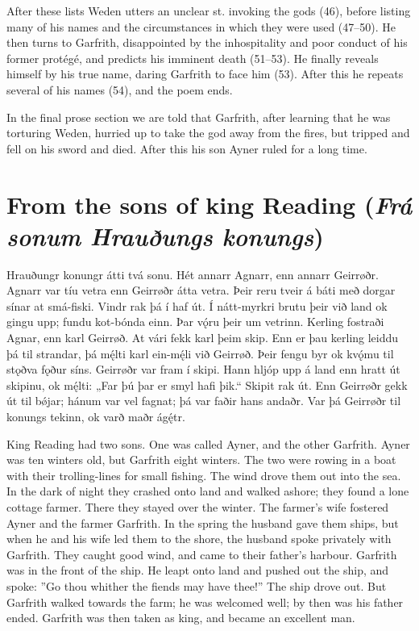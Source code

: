 After these lists Weden utters an unclear st. invoking the gods (46), before listing many of his names and the circumstances in which they were used (47–50). He then turns to Garfrith, disappointed by the inhospitality and poor conduct of his former protégé, and predicts his imminent death (51–53). He finally reveals himself by his true name, daring Garfrith to face him (53). After this he repeats several of his names (54), and the poem ends.

In the final prose section we are told that Garfrith, after learning that he was torturing Weden, hurried up to take the god away from the fires, but tripped and fell on his sword and died. After this his son Ayner ruled for a long time.

\sectionline

\section{From the sons of king Reading (\emph{Frá sonum Hrauðungs konungs})}

\bpg\bpa{}%
Hrauðungr konungr átti tvá sonu. Hét annarr Agnarr, enn annarr Geirrøðr.
Agnarr var tíu vetra enn Geirrøðr átta vetra. Þeir reru tveir á báti með dorgar sínar at smá-fiski.
Vindr rak þá í haf út. Í nátt-myrkri brutu þeir við land ok gingu upp; fundu kot-bónda einn.
Þar vǫ́ru þeir um vetrinn. Kerling fostraði Agnar, enn karl Geirrøð.
At vári fekk karl þeim skip. Enn er þau kerling leiddu þá til strandar, þá mę́lti karl ein-mę́li við Geirrøð.
Þeir fengu byr ok kvǫ́mu til stǫðva fǫður síns. Geirrøðr var fram í skipi.
Hann hljóp upp á land enn hratt út skipinu, ok mę́lti: „Far þú þar er smyl hafi þik.“
Skipit rak út. Enn Geirrøðr gekk út til bǿjar; hánum var vel fagnat; þá var faðir hans andaðr.
Var þá Geirrøðr til konungs tekinn, ok varð maðr ágę́tr.\epa

\bpb King Reading had two sons. One was called Ayner, and the other Garfrith.
Ayner was ten winters old, but Garfrith eight winters. The two were rowing in a boat with their trolling-lines for small fishing.
The wind drove them out into the sea. In the dark of night they crashed onto land and walked ashore; they found a lone cottage farmer.
There they stayed over the winter. The farmer’s wife fostered Ayner and the farmer Garfrith.
In the spring the husband gave them ships, but when he and his wife led them to the shore, the husband spoke privately with Garfrith.
They caught good wind, and came to their father’s harbour. Garfrith was in the front of the ship.
He leapt onto land and pushed out the ship, and spoke: ”Go thou whither the fiends may have thee!”
The ship drove out. But Garfrith walked towards the farm; he was welcomed well; by then was his father ended.
Garfrith was then taken as king, and became an excellent man.\epb\epg


